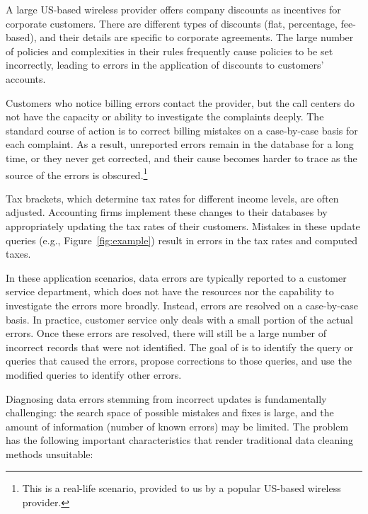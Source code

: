 \begin{example}\label{ex:telco}

A large US-based wireless provider offers company discounts as incentives for
corporate customers. There are different types of discounts (flat, percentage,
fee-based), and their details are specific to corporate agreements. The large
number of policies and complexities in their rules frequently cause policies
to be set incorrectly, leading to errors in the application of discounts to
customers' accounts.

Customers who notice billing errors contact the provider, but the call centers
do not have the capacity or ability to investigate the complaints deeply. The
standard course of action is to correct billing mistakes on a case-by-case
basis for each complaint. As a result, unreported errors remain in the
database for a long time, or they never get corrected, and their cause becomes
harder to trace as the source of the errors is obscured.\footnote{This is a real-life scenario, provided to us by a popular US-based wireless provider.}

\end{example}

\begin{example}\label{ex:taxes}
    
Tax brackets, which determine tax rates for different income levels, are
often adjusted. Accounting firms implement these changes to their
databases by appropriately updating the tax rates of their customers. Mistakes
in these update queries (e.g., Figure~\ref{fig:example}) result in errors in
the tax rates and computed taxes. 

\end{example}


In these application scenarios, data errors are typically reported to a
customer service department, which does not have the resources nor the
capability to investigate the errors more broadly. Instead, errors are
resolved on a case-by-case basis. In practice, customer service only deals
with a small portion of the actual errors. Once these errors are resolved,
there will still be a large number of incorrect records that were not
identified. The goal of \sys is to identify the query or queries that caused
the errors, propose corrections to those queries, and use the modified queries
to identify other errors.

Diagnosing data errors stemming from incorrect updates is fundamentally
challenging: the search space of possible mistakes and fixes is large, and the
amount of information (number of known errors) may be limited. The problem has
the following important characteristics that render traditional data cleaning
methods unsuitable:



